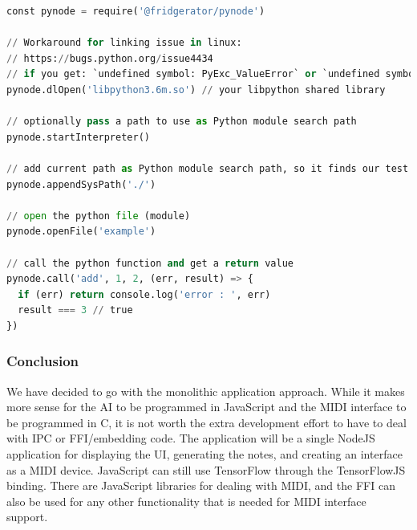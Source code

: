 \begin{minipage}{\linewidth}

  \begin{lstlisting}[language=Python, label={lst:pynode}, caption=Example of using \url{pynode} to embed python in JavaScript \autocite{pynode}, breaklines=true]
const pynode = require('@fridgerator/pynode')

// Workaround for linking issue in linux:
// https://bugs.python.org/issue4434
// if you get: `undefined symbol: PyExc_ValueError` or `undefined symbol: PyExc_SystemError`
pynode.dlOpen('libpython3.6m.so') // your libpython shared library

// optionally pass a path to use as Python module search path
pynode.startInterpreter()

// add current path as Python module search path, so it finds our test.py
pynode.appendSysPath('./')

// open the python file (module)
pynode.openFile('example')

// call the python function and get a return value
pynode.call('add', 1, 2, (err, result) => {
  if (err) return console.log('error : ', err)
  result === 3 // true
})
\end{lstlisting}

\end{minipage}

\subsubsection{Conclusion}

We have decided to go with the monolithic application approach. While it makes more sense
for the AI to be programmed in JavaScript and the MIDI interface to be programmed in C, it
is not worth the extra development effort to have to deal with IPC or FFI/embedding code.
The application will be a single NodeJS application for displaying the UI, generating the
notes, and creating an interface as a MIDI device. JavaScript can still use TensorFlow
through the TensorFlowJS binding. There are JavaScript libraries for dealing with MIDI,
and the FFI can also be used for any other functionality that is needed for MIDI interface
support.
